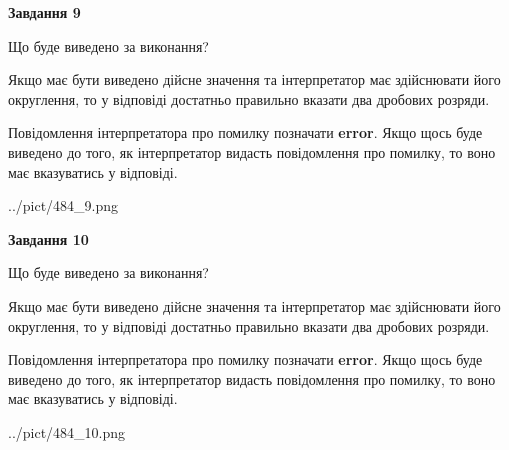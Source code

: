 \documentclass[12pt, ukrainian]{article}
\begin{document}
{\begin {Large}
{\begin {center}\textbf{Завдання 9}\end {center}}\par
Що буде виведено за виконання? \par

Якщо має бути виведено дійсне значення та інтерпретатор має здійснювати його округлення, 
то у відповіді достатньо правильно вказати два дробових розряди.

Повідомлення інтерпретатора про помилку позначати \textbf{error}.
Якщо щось буде виведено до того, як інтерпретатор видасть повідомлення про помилку, 
то воно має вказуватись у відповіді. \par

\begin{center}
	{../pict/484_9.png}
\end{center}
\newpage

{\begin {center}\textbf{Завдання 10}\end {center}}\par
Що буде виведено за виконання? \par

Якщо має бути виведено дійсне значення та інтерпретатор має здійснювати його округлення, 
то у відповіді достатньо правильно вказати два дробових розряди.

Повідомлення інтерпретатора про помилку позначати \textbf{error}.
Якщо щось буде виведено до того, як інтерпретатор видасть повідомлення про помилку, 
то воно має вказуватись у відповіді. \par

\begin{center}
	{../pict/484_10.png}
\end{center}
\newpage

\end {Large}}
\end{document}
